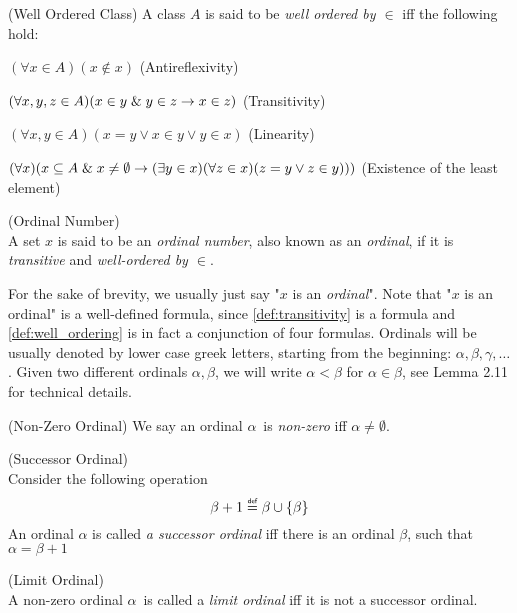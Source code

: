 \begin{definition}{(Well Ordered Class)}\label{def:well_ordering}
A class $A$ is said to be \emph{well ordered by $\in$} iff the following hold:
\bce[(i)]
\item $(\forall x \in A)(x \not\in x)$ (Antireflexivity)
\item $(\forall x, y, z \in A)(x \in y \mathrel{\&} y \in z \rightarrow x \in z)$ (Transitivity)
\item $(\forall x, y \in A)(x = y \lor x \in y \lor y \in x)$ (Linearity)
\item $(\forall x)(x \subseteq A \mathrel{\&} x \neq \emptyset \rightarrow (\exists y \in x)(\forall z \in x)(z = y \lor z \in y)))$ (Existence of the least element)
\ece
\end{definition}

\begin{definition}{(Ordinal Number)}\label{def:ordinal}\\
A set $x$ is said to be an \emph{ordinal number}, also known as an \emph{ordinal}, if it is \emph{transitive} and \emph{well-ordered by $\in$}. 
\end{definition}
For the sake of brevity, we usually just say "$x$ is an \emph{ordinal}". 
Note that "$x$ is an ordinal" is a well-defined formula, since \ref{def:transitivity} is a formula and \ref{def:well_ordering} is in fact a conjunction of four formulas.
Ordinals will be usually denoted by lower case greek letters, starting from the beginning: $\alpha, \beta, \gamma, \ldots$.
Given two different ordinals $\alpha, \beta$, we will write $\alpha < \beta$ for $\alpha \in \beta$, see \cite{JechBook}{Lemma 2.11} for technical details.

\begin{definition}{(Non-Zero Ordinal)}
We say an ordinal $\alpha$ is \emph{non-zero} iff $\alpha \neq \emptyset$.
\end{definition}

\begin{definition}{(Successor Ordinal)}\label{def:successor_ordinal}\\
Consider the following operation
\begin{equation}
\beta + 1 \defeq \beta \cup \{\beta\}
\end{equation}
An ordinal $\alpha$ is called \emph{a successor ordinal} iff there is an ordinal $\beta$, such that $\alpha = \beta+1$
\end{definition}

\begin{definition}{(Limit Ordinal)}\label{def:limit_ordinal}\\
A non-zero ordinal $\alpha$ is called a \emph{limit ordinal} iff it is not a successor ordinal.
\end{definition}

